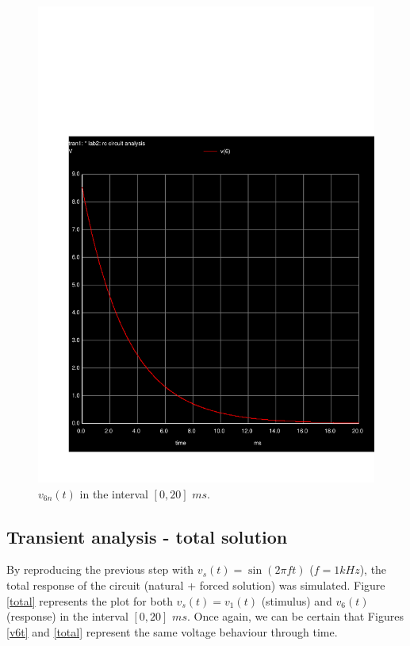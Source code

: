  \begin{figure}[h]
     \centering
         \includegraphics[scale = 0.55]{trans.pdf}
         \caption{$v_{6n}(t)$ in the interval $[0, 20]$ $ms$.}
     \label{trans}
 \end{figure}
 \vspace{5mm}

\subsection{Transient analysis - total solution}

\vspace{5mm}
By reproducing the previous step with $v_s(t)=\sin(2\pi ft)$ ($f=1kHz$), the total response of the circuit (natural + forced solution) was simulated. Figure \ref{total} represents the plot for both $v_s(t)=v_1(t)$ (stimulus) and $v_6(t)$ (response) in the interval $[0, 20]$ $ms$. Once again, we can be certain that Figures \ref{v6t} and \ref{total} represent the same voltage behaviour through time.

